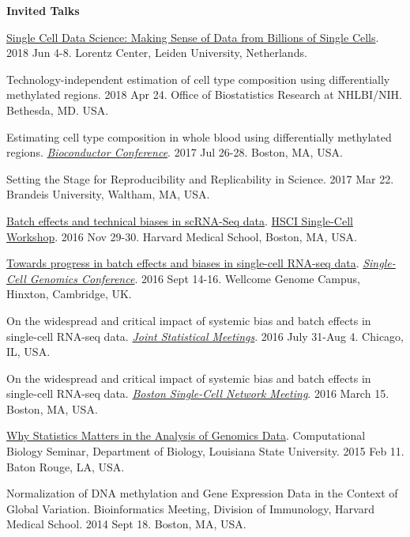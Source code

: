 \documentclass[10pt]{article}
\begin{document}
\textbf{Invited Talks} 
\begin{enumerate}[label= {[\arabic*]}, labelwidth=15pt]
	\item \href{http://lorentzcenter.nl/lc/web/2018/986/info.php3?wsid=986&venue=Oort}{Single Cell Data Science: Making Sense of Data from Billions of Single Cells}. 2018 Jun 4-8. Lorentz Center, Leiden University, Netherlands. 
	\item Technology-independent estimation of cell type composition using differentially methylated regions. 2018 Apr 24. Office of Biostatistics Research at NHLBI/NIH. Bethesda, MD. USA. 
	\item Estimating cell type composition in whole blood using differentially methylated regions. \href{http://bioconductor.org/help/course-materials/2017/BioC2017/}{{\it Bioconductor Conference}}. 2017 Jul 26-28. Boston, MA, USA.  
        \item Setting the Stage for Reproducibility and Replicability in Science. 2017 Mar 22. Brandeis University, Waltham, MA, USA.
	\item \href{https://github.com/hms-dbmi/scw/tree/master/scw2016/tutorials/batcheffects}{Batch effects and technical biases in scRNA-Seq data}. \href{http://hsci.harvard.edu/event/save-date-single-cell-analysis-workshop}{HSCI Single-Cell Workshop}. 2016 Nov 29-30. Harvard Medical School, Boston, MA, USA.  
	\item \href{https://speakerdeck.com/stephaniehicks/towards-progress-in-batch-effects-and-biases-in-single-cell-rna-seq-data}{Towards progress in batch effects and biases in single-cell RNA-seq data}. \href{https://coursesandconferences.wellcomegenomecampus.org/events/item.aspx?e=596}{{\it Single-Cell Genomics Conference}}. 2016 Sept 14-16. Wellcome Genome Campus, Hinxton, Cambridge, UK.
	\item On the widespread and critical impact of systemic bias and batch effects in single-cell RNA-seq data. \href{https://www.amstat.org/meetings/jsm/2016/onlineprogram/MainSearchResults.cfm}{{\it Joint Statistical Meetings}}. 2016 July 31-Aug 4. Chicago, IL, USA. 
	\item On the widespread and critical impact of systemic bias and batch effects in single-cell RNA-seq data. \href{http://hsci.harvard.edu/event/widespread-and-critical-impact-systemic-bias-and-batch-effects-single-cell-rna-seq-data?delta=0}{{\it Boston Single-Cell Network Meeting}}. 2016 March 15. Boston, MA, USA. 
	\item \href{https://speakerdeck.com/stephaniehicks/why-statistics-matters-in-the-analysis-of-genomics-data}{Why Statistics Matters in the Analysis of Genomics Data}. Computational Biology Seminar, Department of Biology, Louisiana State University. 2015 Feb 11. Baton Rouge, LA, USA.  
	\item Normalization of DNA methylation and Gene Expression Data in the Context of Global Variation.  Bioinformatics Meeting, Division of Immunology, Harvard Medical School. 2014 Sept 18. Boston, MA, USA. 
\end{enumerate}
\end{document}
